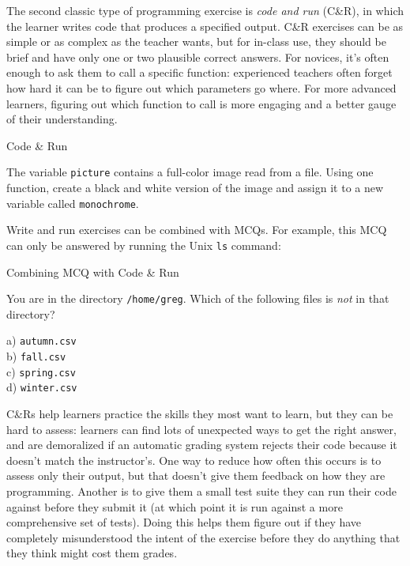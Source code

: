 The second classic type of programming exercise is \emph{code and run}
(C\&R), in which the learner writes code that produces a specified
output.  C\&R exercises can be as simple or as complex as the teacher
wants, but for in-class use, they should be brief and have only one or
two plausible correct answers. For novices, it's often enough to ask
them to call a specific function: experienced teachers often forget
how hard it can be to figure out which parameters go where.  For more
advanced learners, figuring out which function to call is more
engaging and a better gauge of their understanding.

\begin{callout}{Code \& Run}

  The variable \texttt{picture} contains a full-color image read from
  a file.  Using one function, create a black and white version of the
  image and assign it to a new variable called \texttt{monochrome}.

\end{callout}

\noindent
Write and run exercises can be combined with MCQs.  For example, this
MCQ can only be answered by running the Unix \texttt{ls} command:

\begin{callout}{Combining MCQ with Code \& Run}

  You are in the directory \texttt{/home/greg}. Which of the following
  files is \emph{not} in that directory?

  \noindent
  a) \texttt{autumn.csv} \\
  b) \texttt{fall.csv} \\
  c) \texttt{spring.csv} \\
  d) \texttt{winter.csv}

\end{callout}

C\&Rs help learners practice the skills they most want to learn, but
they can be hard to assess: learners can find lots of unexpected ways
to get the right answer, and are demoralized if an automatic grading
system rejects their code because it doesn't match the instructor's.
One way to reduce how often this occurs is to assess only their
output, but that doesn't give them feedback on how they are
programming.  Another is to give them a small test suite they can run
their code against before they submit it (at which point it is run
against a more comprehensive set of tests). Doing this helps them
figure out if they have completely misunderstood the intent of the
exercise before they do anything that they think might cost them
grades.

